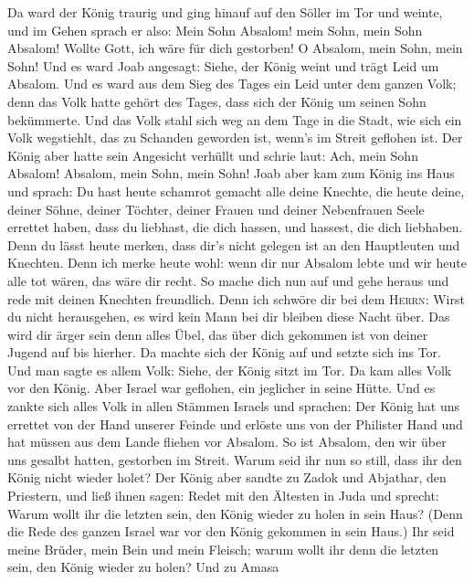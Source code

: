  Da ward der König traurig und ging hinauf auf den Söller
im Tor und weinte, und im Gehen sprach er also: Mein Sohn Absalom! mein
Sohn, mein Sohn Absalom! Wollte Gott, ich wäre für dich gestorben! O
Absalom, mein Sohn, mein Sohn!  Und es ward Joab angesagt:
Siehe, der König weint und trägt Leid um Absalom.  Und es
ward aus dem Sieg des Tages ein Leid unter dem ganzen Volk; denn das
Volk hatte gehört des Tages, dass sich der König um seinen Sohn
bekümmerte.  Und das Volk stahl sich weg an dem Tage in
die Stadt, wie sich ein Volk wegstiehlt, das zu Schanden geworden ist,
wenn's im Streit geflohen ist.  Der König aber hatte sein
Angesicht verhüllt und schrie laut: Ach, mein Sohn Absalom! Absalom,
mein Sohn, mein Sohn!  Joab aber kam zum König ins Haus
und sprach: Du hast heute schamrot gemacht alle deine Knechte, die heute
deine, deiner Söhne, deiner Töchter, deiner Frauen und deiner
Nebenfrauen Seele errettet haben,  dass du liebhast, die
dich hassen, und hassest, die dich liebhaben. Denn du lässt heute
merken, dass dir's nicht gelegen ist an den Hauptleuten und Knechten.
Denn ich merke heute wohl: wenn dir nur Absalom lebte und wir heute alle
tot wären, das wäre dir recht.  So mache dich nun auf und
gehe heraus und rede mit deinen Knechten freundlich. Denn ich schwöre
dir bei dem \textsc{Herrn}: Wirst du nicht herausgehen, es wird kein
Mann bei dir bleiben diese Nacht über. Das wird dir ärger sein denn
alles Übel, das über dich gekommen ist von deiner Jugend auf bis
hierher.  Da machte sich der König auf und setzte sich ins
Tor. Und man sagte es allem Volk: Siehe, der König sitzt im Tor. Da kam
alles Volk vor den König. Aber Israel war geflohen, ein jeglicher in
seine Hütte.  Und es zankte sich alles Volk in allen
Stämmen Israels und sprachen: Der König hat uns errettet von der Hand
unserer Feinde und erlöste uns von der Philister Hand und hat müssen aus
dem Lande fliehen vor Absalom.  So ist Absalom, den wir
über uns gesalbt hatten, gestorben im Streit. Warum seid ihr nun so
still, dass ihr den König nicht wieder holet?  Der König
aber sandte zu Zadok und Abjathar, den Priestern, und ließ ihnen sagen:
Redet mit den Ältesten in Juda und sprecht: Warum wollt ihr die letzten
sein, den König wieder zu holen in sein Haus? (Denn die Rede des ganzen
Israel war vor den König gekommen in sein Haus.)  Ihr
seid meine Brüder, mein Bein und mein Fleisch; warum wollt ihr denn die
letzten sein, den König wieder zu holen?  Und zu Amasa
